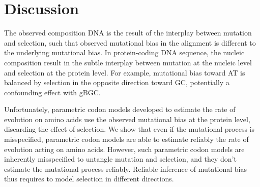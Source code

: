 \begin{table}[htbp]
    \centering
    \noindent{}
    \caption[Estimated parameters]{
    Estimated parameters
    Nucleoprotein alignment of 498 amino acids available for 180 species (left column).
    Lactamase alignment of 263 amino acids available for 85 species (right column).
    }
    \label{tab:mut-bias-estimation}
\end{table}


\section{Discussion}\label{sec:discussion}

The observed composition \acrshort{DNA} is the result of the interplay between mutation and selection, such that observed mutational bias in the alignment is different to the underlying mutational bias.
In protein-coding \acrshort{DNA} sequence, the nucleic composition result in the subtle interplay between mutation at the nucleic level and selection at the protein level.
For example, mutational bias toward AT is balanced by selection in the opposite direction toward GC, potentially a confounding effect with \acrshort{gBGC}.

Unfortunately, parametric codon models developed to estimate the rate of evolution on amino acids use the observed mutational bias at the protein level, discarding the effect of selection.
We show that even if the mutational process is misspecified, parametric codon models are able to estimate reliably the rate of evolution acting on amino acids.
However, such parametric codon models are inherently misspecified to untangle mutation and selection, and they don't estimate the mutational process reliably.
Reliable inference of mutational bias thus requires to model selection in different directions.

